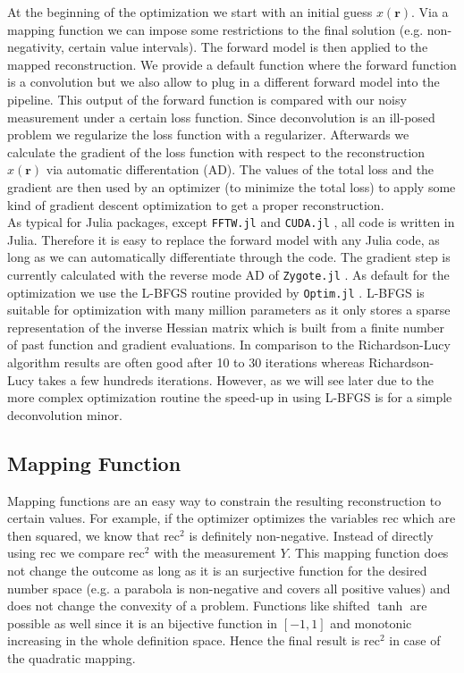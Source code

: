 \documentclass{juliacon}
\begin{document}
At the beginning of the optimization we start with an initial guess $x(\mathbf r)$. 
Via a mapping function we can impose some restrictions to the final solution (e.g. non-negativity, certain value intervals).
The forward model is then applied to the mapped reconstruction. We provide a default function where 
the forward function is a convolution but we also allow to plug in a different forward model into the pipeline.
This output of the forward function is compared
with our noisy measurement under a certain loss function.
Since deconvolution is an ill-posed problem we regularize the loss function with a regularizer.
Afterwards we calculate the gradient of the loss function with respect to the reconstruction $x(\mathbf r)$ via automatic differentation (AD).
The values of the total loss and the gradient are then used by an optimizer (to minimize the total loss) to apply some kind of gradient descent optimization to get a proper reconstruction.\\

As typical for Julia packages, except \verb|FFTW.jl| and \verb|CUDA.jl| \cite{besard2018juliagpu}, all code is written in Julia.
Therefore it is easy to replace the forward model with any Julia code, as long as we can 
automatically differentiate through the code. The gradient step is currently calculated with the reverse mode AD of \verb|Zygote.jl| \cite{Zygote.jl-2018}. 
As default for the optimization we use the L-BFGS \cite{LBFGS} routine provided by \verb|Optim.jl| \cite{mogensen2018optim}.
L-BFGS is suitable for optimization with many million parameters as it only stores a sparse representation of the inverse Hessian matrix
which is built from a finite number of past function and gradient evaluations. 
In comparison to the Richardson-Lucy algorithm results are often good after 10 to 30 iterations whereas Richardson-Lucy takes
a few hundreds iterations. 
However, as we will see later due to the more complex optimization routine the speed-up in using L-BFGS is for a simple 
deconvolution minor.



\subsection{Mapping Function}
    Mapping functions are an easy way to constrain the resulting reconstruction to certain values.
    For example, if the optimizer optimizes the variables $\text{rec}$ which are then squared, we know that
    $\text{rec}^2$ is definitely non-negative. Instead of directly using $\text{rec}$ we compare
    $\text{rec}^2$ with the measurement $Y$. This mapping function does not change the outcome as long
    as it is an surjective function for the desired number space (e.g. a parabola is non-negative and covers all positive values) 
    and does not change the convexity of a problem.
    Functions like shifted $\tanh$ are possible as well since it is an bijective function in $[-1, 1]$ and monotonic increasing
    in the whole definition space.
    Hence the final result is $\text{rec}^2$ in case of the quadratic mapping.
\end{document}
